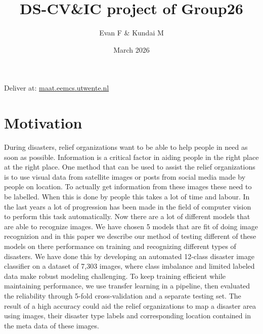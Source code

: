 \documentclass{article}
\title{DS-CV\&IC project of Group26}
\author{Evan F \& Kundai M}
\date{March 2026}
\begin{document}
\maketitle

Deliver at: \href{https://maat.eemcs.utwente.nl/team/239340}{maat.eemcs.utwente.nl}

\section{Motivation}

During disasters, relief organizations want to be able to help people in need as soon as possible. Information is a critical factor in aiding people in the right place at the right place. One method that can be used to assist the relief organizations is to use visual data from satellite images or posts from social media made by people on location. To actually get information from these images these need to be labelled. When this is done by people this takes a lot of time and labour. In the last years a lot of progression has been made in the field of computer vision to perform this task automatically. Now there are a lot of different models that are able to recognize images. We have chosen 5 models that are fit of doing image recognizion and in this paper we describe our method of testing different of these models on there performance on training and recognizing different types of disasters. We have done this by developing an automated 12-class disaster image classifier on a dataset of 7,303 images, where class imbalance and limited labeled data make robust modeling challenging. To keep training efficient while maintaining performance, we use transfer learning in a pipeline, then evaluated the reliability through 5-fold cross-validation and a separate testing set.
The result of a high accuracy could aid the relief organizations to map a disaster area using images, their disaster type labels and corresponding location contained in the meta data of these images.

\end{document}
